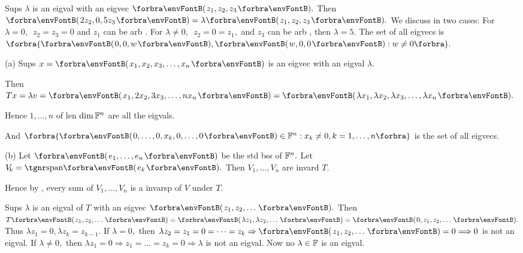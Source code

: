 Sups $\lambda$ is an eigval with an eigvec $\Par{z_1,z_2,z_3}.$\parSol{}
Then $\Par{2z_2, 0,5z_3}=\lambda\Par{z_1,z_2,z_3}.$ We discuss in two cases:\parSol{}
For $\lambda=0,$\, $z_2=z_3=0$ and $z_1$ can be arb .\parSol{}
For $\lambda\neq 0,$\, $z_2=0=z_1,$ and $z_3$ can be arb , then $\lambda=5$.\parSol{}
The set of all eigvecs is $\Bra{\Par{0,0,w},\Par{w,0,0}:w\neq 0}.$\PfEnd
\SepLine

\par\quad
(a) Sups $x=\Par{x_1,x_2,x_3,\dots,x_n}$ is an eigvec with an eigval $\lambda.$\par\quad\Ha
Then $Tx=\lambda v=\Par{x_1,2 x_2,3 x_3,\dots,n x_n}=\Par{\lambda x_1,\lambda x_2,\lambda x_3,\dots,\lambda x_n}.$\par\quad\Ha
Hence $1,\dots,n$ of len $\dim{\mathbb{F}}^n$ are all the eigvals.\par\quad\Ha
And $\Bra{\Par{0,\dots,0,x_k,0,\dots,0}\in\Fbb^n:x_k\neq 0,k=1,\dots,n}$ is the set of all eigvecs.\par\quad
(b) Let $\Par{e_1,\dots,e_n}$ be the std bss of ${\mathbb{F}}^n.$ Let $V_{\!k}=\Span{e_k}.$ Then $V_{\!1},\dots,V_{\!n}$ are invard $T.$\par\quad\Hb
Hence by , every sum of $V_{\!1},\dots,V_{\!n}$ is a invarsp of $V$ under $T.$\PfEnd
\SepLine

Sups $\lambda$ is an eigval of $T$ with an eigvec $\Par{z_1,z_2,\dots}.$\parSol{}
Then $T\Par{z_1,z_2,\dots}=\Par{\lambda z_1,\lambda z_2,\dots}=\Par{0,z_1,z_2,\dots}.$ Thus $\lambda z_1=0,\lambda z_k=z_{k-1}.$\parSol{}
If $\lambda=0,$ then $\lambda z_2=z_1=0=\dots=z_k\Rightarrow\Par{z_1,z_2,\dots}=0\Longrightarrow0$ is not an eigval.\parSol{}
If $\lambda\neq 0,$ then $\lambda z_1=0\Rightarrow z_1=\dots=z_k=0\Longrightarrow\lambda$ is not an eigval. Now no $\lambda\in{\mathbb{F}}$ is an eigval.\PfEnd
\SepLine

